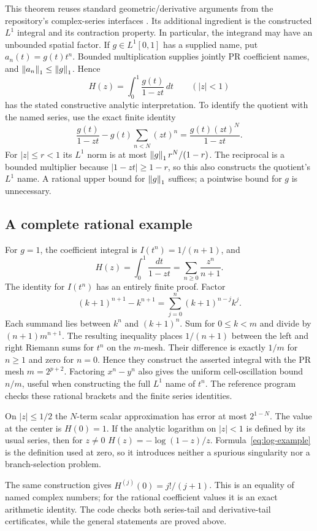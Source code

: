 This theorem reuses standard geometric/derivative arguments from the
repository's complex-series interfaces \cite{repo-complex-series}.
Its additional ingredient is the constructed $L^1$ integral and its
contraction property. In particular, the integrand may have an unbounded
spatial factor. If $g\in L^1[0,1]$ has a supplied name, put
$a_n(t)=g(t)t^n$. Bounded multiplication supplies jointly PR coefficient
names, and $\left\lVert a_n\right\rVert_1\le\left\lVert g\right\rVert_1$. Hence
\[
 H(z)=\int_0^1\frac{g(t)}{1-zt}\,dt\qquad(|z|<1)
\]
has the stated constructive analytic interpretation. To identify the
quotient with the named series, use the exact finite identity
\[
 \frac{g(t)}{1-zt}-g(t)\sum_{n<N}(zt)^n
 =\frac{g(t)(zt)^N}{1-zt}.
\]
For $|z|\le r<1$ its $L^1$ norm is at most
$\left\lVert g\right\rVert_1 r^N/(1-r)$. The reciprocal is a bounded multiplier because
$|1-zt|\ge1-r$, so this also constructs the quotient's $L^1$ name.
A rational upper
bound for $\left\lVert g\right\rVert_1$ suffices; a pointwise bound for $g$ is unnecessary.

\subsection{A complete rational example}

For $g=1$, the coefficient integral is $I(t^n)=1/(n+1)$, and
\begin{equation}\label{eq:log-example}
 H(z)=\int_0^1\frac{dt}{1-zt}
     =\sum_{n\ge0}\frac{z^n}{n+1}.
\end{equation}
The identity for $I(t^n)$ has an entirely finite proof. Factor
\[
 (k+1)^{n+1}-k^{n+1}
 =\sum_{j=0}^{n}(k+1)^{n-j}k^j.
\]
Each summand lies between $k^n$ and $(k+1)^n$.
Sum for $0\le k<m$ and divide by $(n+1)m^{n+1}$. The resulting
inequality places $1/(n+1)$ between the left and right Riemann sums for
$t^n$ on the $m$-mesh. Their difference is exactly $1/m$ for $n\ge1$
and zero for $n=0$. Hence they construct the asserted integral with
the PR mesh $m=2^{p+2}$. Factoring $x^n-y^n$ also gives the uniform
cell-oscillation bound $n/m$, useful when constructing the full $L^1$
name of $t^n$. The reference program checks these rational brackets
and the finite series identities.

On $|z|\le1/2$ the $N$-term scalar approximation has error at most
$2^{1-N}$. The value at the center is $H(0)=1$. If the analytic logarithm
on $|z|<1$ is defined by its usual series, then for $z\ne0$
$H(z)=-\log(1-z)/z$. Formula~\eqref{eq:log-example} is the definition
used at zero, so it introduces neither a spurious singularity nor a
branch-selection problem.

The same construction gives
$H^{(j)}(0)=j!/(j+1)$. This is an equality of named complex numbers;
for the rational coefficient values it is an exact arithmetic identity.
The code checks both series-tail and derivative-tail certificates, while
the general statements are proved above.
